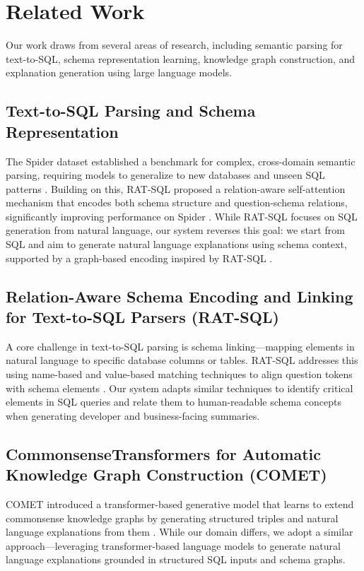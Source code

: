 \documentclass[11pt]{article}
\begin{document}
\section{Related Work}

Our work draws from several areas of research, including semantic parsing for text-to-SQL, schema representation learning, knowledge graph construction, and explanation generation using large language models.

\subsection{Text-to-SQL Parsing and Schema Representation}

The Spider dataset established a benchmark for complex, cross-domain semantic parsing, requiring models to generalize to new databases and unseen SQL patterns \citep{yu-etal-2018-spider}. Building on this, RAT-SQL proposed a relation-aware self-attention mechanism that encodes both schema structure and question-schema relations, significantly improving performance on Spider \citep{wang-etal-2020-rat}. While RAT-SQL focuses on SQL generation from natural language, our system reverses this goal: we start from SQL and aim to generate natural language explanations using schema context, supported by a graph-based encoding inspired by RAT-SQL \citep{wang-etal-2020-rat}.
 
\subsection{Relation-Aware Schema Encoding and Linking
 for Text-to-SQL Parsers (RAT-SQL)}

A core challenge in text-to-SQL parsing is schema linking—mapping elements in natural language to specific database columns or tables. RAT-SQL addresses this using name-based and value-based matching techniques to align question tokens with schema elements \citep{wang-etal-2020-rat}. Our system adapts similar techniques to identify critical elements in SQL queries and relate them to human-readable schema concepts when generating developer and business-facing summaries.
 
\subsection{CommonsenseTransformers for Automatic Knowledge Graph Construction (COMET)}

COMET introduced a transformer-based generative model that learns to extend commonsense knowledge graphs by generating structured triples and natural language explanations from them \citep{bosselut-etal-2019-comet}. While our domain differs, we adopt a similar approach—leveraging transformer-based language models to generate natural language explanations grounded in structured SQL inputs and schema graphs.
\end{document}
